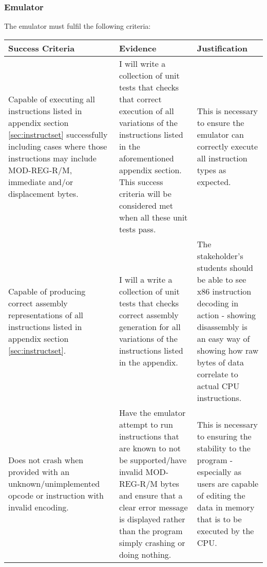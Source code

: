     \subsubsection{Emulator}
        The emulator must fulfil the following criteria:

        \begin{tabular} { | m{} | m{} | m{} | }
            \hline
            \textbf{Success Criteria} & \textbf{Evidence} & \textbf{Justification} \\
            \hline
            Capable of executing all instructions listed in appendix section \ref{sec:instructset} successfully including cases where those instructions may include MOD-REG-R/M, immediate and/or displacement bytes. &
            I will write a collection of unit tests that checks that correct execution of all  variations of the instructions listed in the aforementioned appendix section. This success criteria will be considered met when all these unit tests pass. &
            This is necessary to ensure the emulator can correctly execute all instruction types as expected. \\
            \hline
            Capable of producing correct assembly representations of all instructions listed in appendix section \ref{sec:instructset}. &
            I will a write a collection of unit tests that checks correct assembly generation for all variations of the instructions listed in the appendix. &
            The stakeholder's students should be able to see x86 instruction decoding in action - showing disassembly is an easy way of showing how raw bytes of data correlate to actual CPU instructions. \\
            \hline
            Does not crash when provided with an unknown/unimplemented opcode or instruction with invalid encoding. &
            Have the emulator attempt to run instructions that are known to not be supported/have invalid MOD-REG-R/M bytes and ensure that a clear error message is displayed rather than the program simply crashing or doing nothing. &
            This is necessary to ensuring the stability to the program - especially as users are capable of editing the data in memory that is to be executed by the CPU. \\
            \hline
        \end{tabular}
